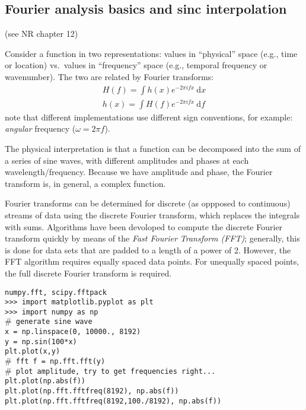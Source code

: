 \documentclass[12pt]{article}
\begin{document}
\subsection{Fourier analysis basics and sinc interpolation}
(see NR chapter 12)

Consider a function in two representations: values in
``physical'' space (e.g., time or location) vs.\ values in ``frequency'' space
(e.g., temporal frequency or wavenumber). The two are related by Fourier
transforms:
\begin{align*}
    H(f) = \int \! h(x)e^{-2 \pi i f x} \ \textrm{d}x \\
    h(x) = \int \! H(f)e^{-2 \pi i f x} \ \textrm{d}f
\end{align*}
note that different implementations use different sign conventions,
for example: \emph{angular} frequency ($\omega = 2\pi f$).

The physical interpretation is that a function can be decomposed into the sum
of a series of sine waves, with different amplitudes and phases at each
wavelength/frequency. Because we have amplitude and phase, the Fourier
transform is, in general, a complex function.

Fourier transforms can be determined for discrete (as oppposed to continuous)
streams of data using the discrete Fourier transform, which replaces the
integrals with sums. Algorithms have been devoloped to compute the discrete
Fourier transform quickly by means of the \emph{Fast Fourier Transform (FFT)};
generally, this is done for data sets that are padded to a length of a power
of 2. However, the FFT algorithm requires equally spaced data points. For
unequally spaced points, the full discrete Fourier transform is required.

\texttt{numpy.fft, scipy.fftpack \\
>>> import matplotlib.pyplot as plt \\
>>> import numpy as np \\
$\#$ generate sine wave \\
x = np.linspace(0, 10000., 8192) \\
y = np.sin(100*x) \\
plt.plot(x,y) \\
$\#$ fft
f = np.fft.fft(y) \\
$\#$ plot amplitude, try to get frequencies right... \\
plt.plot(np.abs(f)) \\
plt.plot(np.fft.fftfreq(8192), np.abs(f)) \\
plt.plot(np.fft.fftfreq(8192,100./8192), np.abs(f))}
\end{document}

